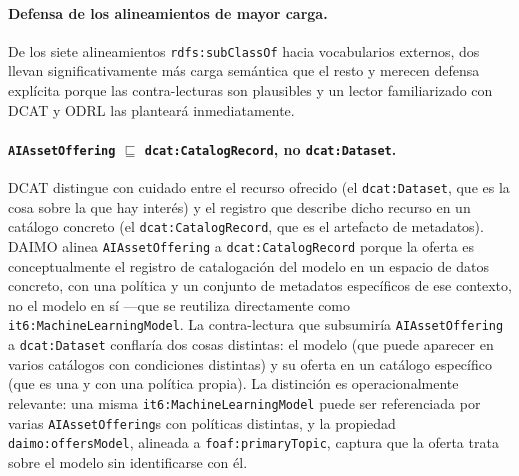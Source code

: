 \documentclass[Afour,sagev,times]{sagej}
\newcommand{\code}[1]{\texttt{#1}}
\begin{document}
\paragraph{Defensa de los alineamientos de mayor carga.}\label{sec:alignment-defense}

De los siete alineamientos \code{rdfs:subClassOf} hacia vocabularios externos, dos llevan significativamente más carga semántica que el resto y merecen defensa explícita porque las contra-lecturas son plausibles y un lector familiarizado con DCAT y ODRL las planteará inmediatamente.

\paragraph{\code{AIAssetOffering} $\sqsubseteq$ \code{dcat:CatalogRecord}, no \code{dcat:Dataset}.} DCAT distingue con cuidado entre el recurso ofrecido (el \code{dcat:Dataset}, que es la cosa sobre la que hay interés) y el registro que describe dicho recurso en un catálogo concreto (el \code{dcat:CatalogRecord}, que es el artefacto de metadatos). DAIMO alinea \code{AIAssetOffering} a \code{dcat:CatalogRecord} porque la oferta es conceptualmente el registro de catalogación del modelo en un espacio de datos concreto, con una política y un conjunto de metadatos específicos de ese contexto, no el modelo en sí ---que se reutiliza directamente como \code{it6:MachineLearningModel}. La contra-lectura que subsumiría \code{AIAssetOffering} a \code{dcat:Dataset} conflaría dos cosas distintas: el modelo (que puede aparecer en varios catálogos con condiciones distintas) y su oferta en un catálogo específico (que es una y con una política propia). La distinción es operacionalmente relevante: una misma \code{it6:MachineLearningModel} puede ser referenciada por varias \code{AIAssetOffering}s con políticas distintas, y la propiedad \code{daimo:offersModel}, alineada a \code{foaf:primaryTopic}, captura que la oferta trata sobre el modelo sin identificarse con él.
\end{document}
